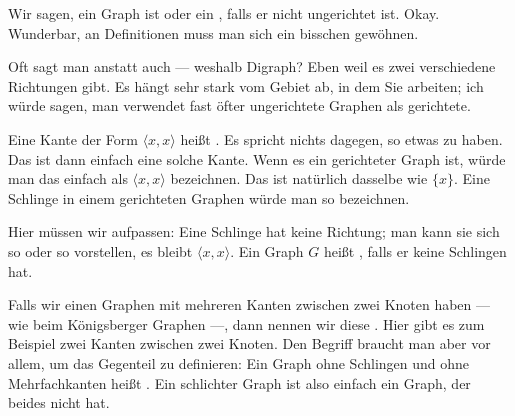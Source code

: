 \begin{spoken-clean}[00:22:54 - 00:25:30]
Wir sagen, ein Graph ist  oder ein , falls er nicht ungerichtet ist. Okay. Wunderbar, an Definitionen muss man sich ein bisschen gewöhnen.

Oft sagt man anstatt  auch  --- weshalb Digraph? Eben weil es zwei verschiedene Richtungen gibt. Es hängt sehr stark vom Gebiet ab, in dem Sie arbeiten; ich würde sagen, man verwendet fast öfter ungerichtete Graphen als gerichtete.

Eine Kante der Form $\langle x, x \rangle$ heißt . Es spricht nichts dagegen, so etwas zu haben. Das ist dann einfach eine solche Kante. Wenn es ein gerichteter Graph ist, würde man das einfach als $\langle x, x \rangle$ bezeichnen. Das ist natürlich dasselbe wie $\{x\}$. Eine Schlinge in einem gerichteten Graphen würde man so bezeichnen.

Hier müssen wir aufpassen: Eine Schlinge hat keine Richtung; man kann sie sich so oder so vorstellen, es bleibt $\langle x, x \rangle$. Ein Graph $G$ heißt , falls er keine Schlingen hat.

Falls wir einen Graphen mit mehreren Kanten zwischen zwei Knoten haben --- wie beim Königsberger Graphen ---, dann nennen wir diese . Hier gibt es zum Beispiel zwei Kanten zwischen zwei Knoten. Den Begriff braucht man aber vor allem, um das Gegenteil zu definieren: Ein Graph ohne Schlingen und ohne Mehrfachkanten heißt . Ein schlichter Graph ist also einfach ein Graph, der beides nicht hat.
\end{spoken-clean}

\begin{math-stroke}


\end{math-stroke}

